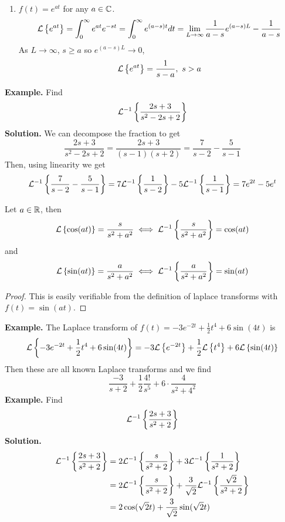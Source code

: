 \documentclass[openany]{report}
\begin{document}
\begin{enumerate}
\begin{proof}
\begin{align*}
            &= -\frac{d}{ds} \frac{k!}{s^{k+1}}\\
            &= (k+1)\frac{k!}{s^{k+1+1}}\\
            &= \frac{(k+1)!}{s^{k+1+1}}
        \end{align*}
        Therefore $\laplace{t^n} = \frac{n!}{s^{n+1}}$ for all $n \in \nat$. 
    \end{proof}
    \item $f(t) = e^{at}$ for any $a \in \mathbb{C}$. 
    \[\mathcal{L}\left\{e^{at}\right\} = \int_0^\infty e^{at}e^{-st} = \int_0^\infty e^{(a-s)t}dt = \lim_{L\rightarrow \infty} \frac{1}{a-s}e^{(a-s)L} - \frac{1}{a-s}\]
    As $L \rightarrow \infty$, $s \geq a$ so $e^{(a-s)L} \rightarrow 0$, 
    \[\mathcal{L}\left\{e^{at}\right\} = \frac{1}{s-a}, \ s > a\]
\end{enumerate}
\noindent
\textbf{Example.} Find 
\[\mathcal{L}^{-1}\left\{\frac{2s+3}{s^2-2s+2}\right\}\]
\textbf{Solution.} We can decompose the fraction to get 
\[\frac{2s+3}{s^2-2s + 2} = \frac{2s+3}{(s-1)(s+2)} = \frac{7}{s-2} - \frac{5}{s-1}\]
Then, using linearity we get 
\[\mathcal{L}^{-1}\left\{\frac{7}{s-2} - \frac{5}{s-1}\right\} = 7\mathcal{L}^{-1}\left\{\frac{1}{s-2}\right\} -5\mathcal{L}^{-1}\left\{\frac{1}{s-1}\right\} = 7e^{2t} - 5e^t\]

\begin{theorem}
    Let $a \in \mathbb{R}$, then 
    \[\mathcal{L}\left\{\cos(at)\right\} = \frac{s}{s^2 + a^2} \iff \mathcal{L}^{-1}\left\{\frac{s}{s^2+a^2}\right\} = \cos(at)\]
    and 
    \[\mathcal{L}\left\{\sin(at)\right\} = \frac{a}{s^2+a^2} \iff \mathcal{L}^{-1}\left\{\frac{a}{s^2+a^2}\right\} = \sin(at)\]
\end{theorem}
\begin{proof}
    This is easily verifiable from the definition of laplace transforms with $f(t) = \sin(at)$. 
\end{proof}
\noindent
\textbf{Example.} The Laplace transform of $f(t) = -3e^{-2t} + \frac{1}{2}t^4 + 6\sin(4t)$ is 
\[\mathcal{L}\left\{-3e^{-2t} + \frac{1}{2}t^4 + 6\sin(4t)\right\} = -3\mathcal{L}\left\{e^{-2t}\right\} + \frac{1}{2}\mathcal{L}\left\{t^4\right\} + 6\mathcal{L}\left\{\sin(4t)\right\}\]
Then these are all known Laplace transforms and we find 
\[\frac{-3}{s+2} + \frac{1}{2}\frac{4!}{s^5} + 6 \cdot \frac{4}{s^2 + 4^2}\]
\textbf{Example.} Find 
\[\mathcal{L}^{-1}\left\{\frac{2s+3}{s^2+2}\right\}\]
\textbf{Solution.} 
\begin{align*}
    \mathcal{L}^{-1}\left\{\frac{2s+3}{s^2+2}\right\} &= 2\mathcal{L}^{-1}\left\{\frac{s}{s^2+2}\right\} + 3\mathcal{L}^{-1}\left\{\frac{1}{s^2+2}\right\}\\
    &=  2\mathcal{L}^{-1}\left\{\frac{s}{s^2+2}\right\} + \frac{3}{\sqrt{2}}\mathcal{L}^{-1}\left\{\frac{\sqrt{2}}{s^2+2}\right\} \\
    &= 2\cos(\sqrt{2}t) + \frac{3}{\sqrt{2}}\sin(\sqrt{2}t)
\end{align*}
\end{document}
